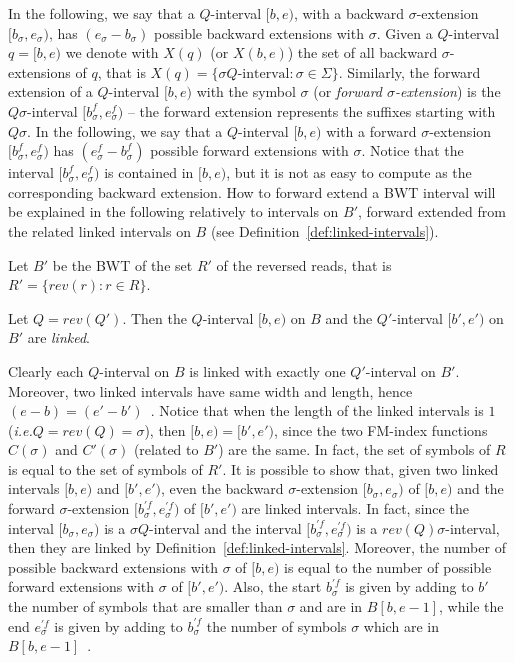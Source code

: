 \documentclass[runningheads,envcountsame,a4paper]{llncs}
\newcommand{\ie}{\textit{i.e.}\xspace}
\begin{document}
In the following,
we say that a  $Q$-interval $[b,e)$, with a backward $\sigma$-extension $[b_{\sigma},e_{\sigma})$, has $(e_{\sigma}-b_{\sigma})$ possible backward
extensions with $\sigma$.
Given a $Q$-interval $q=[b,e)$ we denote with $X(q)$ (or $X(b,e)$)
the set of all  backward $\sigma$-extensions of $q$, that is $X(q)=\{ \sigma Q\text{-interval}: \sigma\in\Sigma\}$.
Similarly, the forward extension of a $Q$-interval $[b,e)$ with the symbol
$\sigma$ (or  \emph{forward $\sigma$-extension}) is the
$Q \sigma$-interval $[b^f_{\sigma},e^f_{\sigma})$ -- the forward extension represents the suffixes
starting with $Q \sigma$. In the following, we say that a
$Q$-interval $[b,e)$ with  a forward $\sigma$-extension
$[b^f_{\sigma},e^f_{\sigma})$ has $(e^f_{\sigma}-b^f_{\sigma})$
possible forward extensions with $\sigma$. Notice that the interval
$[b^f_{\sigma},e^f_{\sigma})$ is contained in $[b,e)$, but it is not as easy to compute as the corresponding backward extension. How to forward extend a BWT interval will be explained in the following relatively to intervals on $B'$, forward extended from the related linked intervals on $B$ (see Definition~\ref{def:linked-intervals}).

Let $B'$ be the BWT of the set $R'$ of the reversed reads,
that is $R' = \{ rev(r): r \in R\}$.

\begin{definition}
\label{def:linked-intervals}
Let  $Q=rev(Q')$.
Then the $Q$-interval $[b,e)$ on $B$ and the $Q'$-interval $[b',e')$ on $B'$ are
\emph{linked}.
\end{definition}

Clearly each $Q$-interval on $B$ is linked with exactly one $Q'$-interval on $B'$.
Moreover, two linked intervals have same width and length, hence $(e-b)=(e'-b')$~\cite{Lam2009,Simpson2010}.
Notice that when the length of the linked intervals is $1$ (\ie $Q=rev(Q)=\sigma$), then $[b,e)=[b',e')$,
since the two FM-index functions $C(\sigma)$ and $C'(\sigma)$ (related to $B'$) are the same.
In fact, the set of symbols of $R$ is equal to the set of symbols of $R'$.
It is possible to show that, given two linked intervals $[b,e)$ and $[b',e')$, even the backward $\sigma$-extension $[b_{\sigma},e_{\sigma})$ of $[b,e)$ and the forward $\sigma$-extension $[b^{'f}_{\sigma},e^{'f}_{\sigma})$ of $[b',e')$ are linked intervals.
In fact, since the interval $[b_{\sigma},e_{\sigma})$ is a $\sigma Q$-interval and the interval $[b^{'f}_{\sigma},e^{'f}_{\sigma})$ is a $rev(Q) \sigma$-interval, then they are linked by Definition~\ref{def:linked-intervals}.
Moreover, the number of possible backward extensions with $\sigma$ of $[b,e)$ is equal to the number of possible forward extensions with $\sigma$ of $[b',e')$.
Also,  the start $b^{'f}_{\sigma}$ is given by adding to $b'$ the number of symbols that are smaller than $\sigma$ and are in $B[b,e-1]$,
while the end $e^{'f}_{\sigma}$ is given by adding to $b^{'f}_{\sigma}$ the number of symbols $\sigma$ which are in $B[b,e-1]$~\cite{Simpson2010}.
\end{document}
